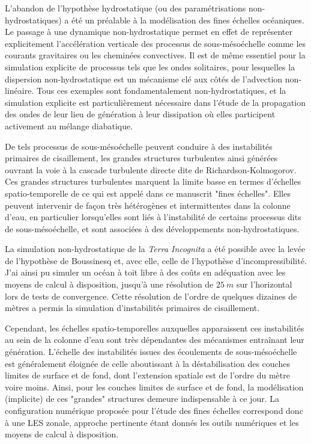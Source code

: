 L'abandon de l'hypothèse hydrostatique (ou des paramétrisations non-hydrostatiques) a été un préalable à la modélisation des fines échelles océaniques. Le passage à une dynamique non-hydrostatique permet en effet de représenter explicitement l'accélération verticale des processus de sous-mésoéchelle comme les courants gravitaires ou les cheminées convectives. Il est de même essentiel pour la simulation explicite de processus tels que les ondes solitaires, pour lesquelles la dispersion non-hydrostatique est un mécanisme clé aux côtés de l'advection non-linéaire. Tous ces exemples sont fondamentalement non-hydrostatiques, et la simulation explicite est particulièrement nécessaire dans l'étude de la propagation des ondes de leur lieu de génération à leur dissipation où elles participent activement au mélange diabatique. 

De tels processus de sous-mésoéchelle peuvent conduire à des instabilités primaires de cisaillement, les grandes structures turbulentes ainsi générées ouvrant la voie à la cascade turbulente directe dite de Richardson-Kolmogorov. Ces grandes structures turbulentes marquent la limite basse en termes d'échelles spatio-temporelle de ce qui est appelé dans ce manuscrit "fines échelles". Elles peuvent intervenir de façon très hétérogènes et intermittentes dans la colonne d'eau, en particulier lorsqu'elles sont liés à l'instabilité de certains processus dits de sous-mésoéchelle, et sont associées à des développements non-hydrostatiques.

La simulation non-hydrostatique de la \textit{Terra Incognita} a été possible avec la levée de l'hypothèse de Boussinesq et, avec elle, celle de l'hypothèse d'incompressibilité. J'ai ainsi pu simuler un océan à toit libre à des coûts en adéquation avec les moyens de calcul à disposition, jusqu'à une résolution de $25\ m$ sur l'horizontal lors de tests de convergence. Cette résolution de l'ordre de quelques dizaines de mètres a permis la simulation d'instabilités primaires de cisaillement.

Cependant, les échelles spatio-temporelles auxquelles apparaissent ces instabilités au sein de la colonne d'eau sont très dépendantes des mécanismes entraînant leur génération. L'échelle des instabilités issues des écoulements de sous-mésoéchelle est généralement éloignée de celle aboutissant à la déstabilisation des couches limites de surface et de fond, dont l'extension spatiale est de l'ordre du mètre voire moins.
Ainsi, pour les couches limites de surface et de fond, la modélisation (implicite) de ces "grandes" structures demeure indispensable à ce jour. La configuration numérique proposée pour l'étude des fines échelles correspond donc à une LES zonale, approche pertinente étant donnés les outils numériques et les moyens de calcul à disposition.\\

